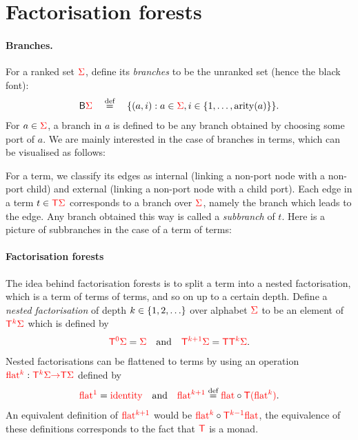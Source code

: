 \section{Factorisation forests}

\newcommand{\branches}{\mathsf{B}}

\paragraph{Branches.}
For a ranked set ${\color{red}{\Sigma}}$, define its \emph{branches} to be the unranked set (hence the black font):
\begin{align*}
\branches \rSigma \quad \eqdef \quad \set{(a,i) : a \in \rSigma, i \in \set{1,\ldots,\arity a}}.
\end{align*}
For $a \in  {\color{red}{\Sigma}}$, a branch in $a$ is defined to be any branch obtained by choosing some port of $a$. 
We are mainly interested in the case of branches in terms, which can be visualised as follows:
 
For a term, we classify its edges as internal (linking a non-port node with a non-port child) and external (linking a non-port node with a child port). Each edge in a term $t \in {\color{red}{\mathsf T}} {\color{red}{\Sigma}}$ corresponds to a branch over ${\color{red}{\Sigma}}$, namely the branch which leads to the edge. Any branch obtained this way is called a \emph{subbranch} of $t$. Here is a picture of subbranches in the case of a term of terms:

\paragraph{Factorisation forests} The idea behind factorisation forests is to split a term into a nested factorisation, which is a term of terms of terms, and so on up to a certain depth.  
Define a \emph{nested factorisation} of depth $k \in \{1,2,\ldots\}$ over alphabet ${\color{red}{\Sigma}}$ to be an element of ${\color{red}{\mathsf T}}^{{\color{red}{k}}} {\color{red}{\Sigma}}$ which is defined by
\begin{align*}
{\color{red}{\mathsf T}}^{{\color{red}{0}}} {\color{red}{\Sigma}} = {\color{red}{\Sigma}}  \quad \text{and} \quad {\color{red}{\mathsf T}}^{{\color{red}{k+1}}}{\color{red}{\Sigma}} = {\color{red}{\mathsf T}} {\color{red}{\mathsf T}}^{{\color{red}{k}}} {\color{red}{\Sigma}}.
\end{align*}
Nested factorisations can be flattened to terms by using an  operation ${\color{red}{\mathrm{flat}}}^{{\color{red}{k}}} : {\color{red}{\mathsf T}}^{{\color{red}{k}}} {\color{red}{\Sigma}} {\color{red}{\to}} {\color{red}{\mathsf T}} {\color{red}{\Sigma}} $ defined by 
\begin{align*}
     {\color{red}{\mathrm{flat}}}^{{\color{red}{1}}} = \text{{\color{red}{identity}}} \quad \text{and} \quad  {\color{red}{\mathrm{flat}}}^{{\color{red}{k+1}}} \stackrel{\text{def}}= {\color{red}{\mathrm{flat}}}  \circ {\color{red}{\mathsf T}} {\color{red}{(}} {\color{red}{\mathrm{flat}}}^{{\color{red}{k}}}{\color{red}{)}}.
\end{align*}
An equivalent definition of ${\color{red}{\mathrm{flat}}}^{{\color{red}{k+1}}}$ would be ${\color{red}{\mathrm{flat}}}^{{\color{red}{k}}} \circ {\color{red}{\mathsf T}}^{{\color{red}{k-1}}} {\color{red}{\mathrm{flat}}}$, the equivalence of these definitions corresponds to the fact that ${\color{red}{\mathsf T}}$ is a monad.



